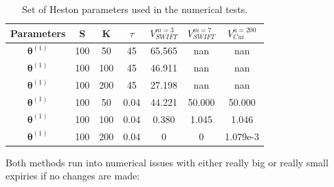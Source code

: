 \documentclass[12,twoside]{mammeTFM}
\theoremstyle{definition}
\theoremstyle{remark}
\begin{document}
\begin{table}[!h]
\begin{center}
 \begin{tabular}{|c | c | c | c | c | c | c |} 
 \hline
 Parameters & S & K & $\tau$ & $V_{SWIFT}^{m=3}$ & $V_{SWIFT}^{m=7}$ & $V_{Cui}^{\overline{u} = 200}$ \\ [0.5ex] 
 \hline
 $\boldsymbol{\theta}^{(1)}$ & 100 & 50  & 45   & 65.565 & nan & nan \\ 
 \hline
 $\boldsymbol{\theta}^{(1)}$ & 100 & 100 & 45   & 46.911 & nan & nan \\ 
 \hline
 $\boldsymbol{\theta}^{(1)}$ & 100 & 200 & 45   & 27.198 & nan & nan \\ 
 \hline
 $\boldsymbol{\theta}^{(1)}$ & 100 & 50  & 0.04 & 44.221 & 50.000 & 50.000 \\ 
 \hline
 $\boldsymbol{\theta}^{(1)}$ & 100 & 100 & 0.04 & 0.380  & 1.045 & 1.046 \\ 
 \hline
 $\boldsymbol{\theta}^{(1)}$ & 100 & 200 & 0.04 & 0      & 0 & 1.079e-3 \\
 \hline
\end{tabular}
\end{center}
\caption{Set of Heston parameters used in the numerical tests.}\label{table:stress}
\end{table}

Both methods run into numerical issues with either really big or really small expiries if no changes are made:
\end{document}
